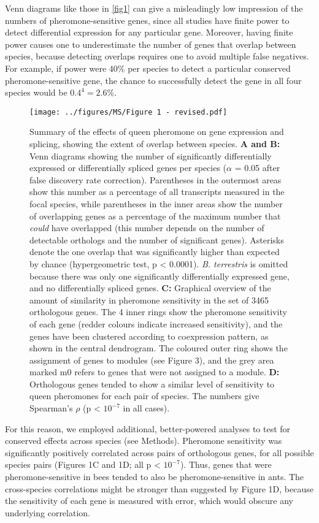 \documentclass[12pt,]{article}
\begin{document}
Venn diagrams like those in \autoref{fig1} can give a misleadingly low
impression of the numbers of pheromone-sensitive genes, since all
studies have finite power to detect differential expression for any
particular gene. Moreover, having finite power causes one to
underestimate the number of genes that overlap between species, because
detecting overlaps requires one to avoid multiple false negatives. For
example, if power were 40\% per species to detect a particular conserved
pheromone-sensitive gene, the chance to successfully detect the gene in
all four species would be \(0.4^4 = 2.6\%\).

\begin{figure}
\centering
\texttt{[image: ../figures/MS/Figure 1 - revised.pdf]}
\caption{Summary of the effects of queen pheromone on gene expression
and splicing, showing the extent of overlap between species. \textbf{A
and B:} Venn diagrams showing the number of significantly differentially
expressed or differentially spliced genes per species (\(\alpha\) = 0.05
after false discovery rate correction). Parentheses in the outermost
areas show this number as a percentage of all transcripts measured in
the focal species, while parentheses in the inner areas show the number
of overlapping genes as a percentage of the maximum number that
\emph{could} have overlapped (this number depends on the number of
detectable orthologs and the number of significant genes). Asterisks
denote the one overlap that was significantly higher than expected by
chance (hypergeometric test, p \textless{} 0.0001). \emph{B. terrestris}
is omitted because there was only one significantly differentially
expressed gene, and no differentially spliced genes. \textbf{C:}
Graphical overview of the amount of similarity in pheromone sensitivity
in the set of 3465 orthologous genes. The 4 inner rings show the
pheromone sensitivity of each gene (redder colours indicate increased
sensitivity), and the genes have been clustered according to
coexpression pattern, as shown in the central dendrogram. The coloured
outer ring shows the assignment of genes to modules (see Figure 3), and
the grey area marked m0 refers to genes that were not assigned to a
module. \textbf{D:} Orthologous genes tended to show a similar level of
sensitivity to queen pheromones for each pair of species. The numbers
give Spearman's \(\rho\) (p \textless{} \(10^{-7}\) in all cases).
\label{fig1}}
\end{figure}

For this reason, we employed additional, better-powered analyses to test
for conserved effects across species (see Methods). Pheromone
sensitivity was significantly positively correlated across pairs of
orthologous genes, for all possible species pairs (Figures 1C and 1D;
all p \textless{} \(10^{-7}\)). Thus, genes that were
pheromone-sensitive in bees tended to also be pheromone-sensitive in
ants. The cross-species correlations might be stronger than suggested by
Figure 1D, because the sensitivity of each gene is measured with error,
which would obscure any underlying correlation.
\end{document}
